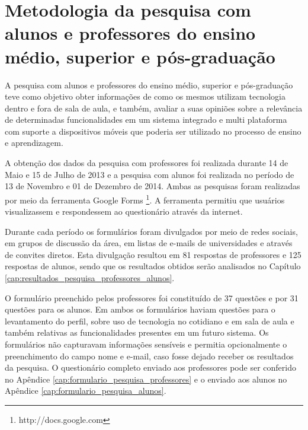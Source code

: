 

\section{Metodologia da pesquisa com alunos e professores do ensino médio, superior e pós-graduação}
\label{sec:metodologia_professores}

A pesquisa com alunos e professores do ensino médio, superior e pós-graduação teve como objetivo obter informações de como os mesmos utilizam tecnologia dentro e fora de sala de aula, e também, avaliar a suas opiniões sobre a relevância de determinadas funcionalidades em um sistema integrado e multi plataforma com suporte a dispositivos móveis que poderia ser utilizado no processo de ensino e aprendizagem.

A obtenção dos dados da pesquisa com professores foi realizada durante 14 de Maio e 15 de Julho de 2013 e a pesquisa com alunos foi realizada no período de 13 de Novembro e 01 de Dezembro de 2014. Ambas as pesquisas foram realizadas por meio da ferramenta Google Forms \footnote{http://docs.google.com}. A ferramenta permitiu que usuários visualizassem e respondessem ao questionário através da internet. 

Durante cada período os formulários foram divulgados por meio de redes sociais, em grupos de discussão da área, em listas de e-mails de universidades e através de convites diretos. Esta divulgação resultou em 81 respostas de professores e 125 respostas de alunos, sendo que os resultados obtidos serão analisados no Capítulo \ref{cap:resultados_pesquisa_professores_alunos}.

O formulário preenchido pelos professores foi constituído de 37 questões e por 31 questões para os alunos. Em ambos os formulários haviam questões para o levantamento do perfil, sobre uso de tecnologia no cotidiano e em sala de aula e também relativas as funcionalidades presentes em um futuro sistema. Os formulários não capturavam informações sensíveis e permitia opcionalmente o preenchimento do campo nome e e-mail, caso fosse dejado receber os resultados da pesquisa. O questionário completo enviado aos professores pode ser conferido no Apêndice \ref{cap:formulario_pesquisa_professores} e o enviado aos alunos no Apêndice \ref{cap:formulario_pesquisa_alunos}.

